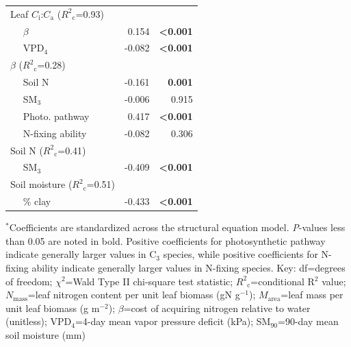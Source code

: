 \begin{table}
\begin{tabular}{p{0.5cm}p{3cm}p{1.5cm}p{1.5cm}}
            \multicolumn{2}{l}{Leaf $C_\mathrm{i}$:$C_\mathrm{a}$ ($R^2{}_\mathrm{c}$=0.93)} && \\
            & \multicolumn{1}{l}{$\beta$}                               & \multicolumn{1}{r}{0.154}     & \multicolumn{1}{r}{\textbf{<0.001}} \\
            & \multicolumn{1}{l}{VPD$_4$}                               & \multicolumn{1}{r}{-0.082}    & \multicolumn{1}{r}{\textbf{<0.001}} \\
            \hline

            \multicolumn{2}{l}{$\beta$ ($R^2{}_\mathrm{c}$=0.28)} && \\
            & \multicolumn{1}{l}{Soil N}                                & \multicolumn{1}{r}{-0.161}    & \multicolumn{1}{r}{\textbf{0.001}} \\
            & \multicolumn{1}{l}{SM$_{3}$}                             & \multicolumn{1}{r}{-0.006}    & \multicolumn{1}{r}{0.915} \\
            & \multicolumn{1}{l}{Photo. pathway}                        & \multicolumn{1}{r}{0.417}     & \multicolumn{1}{r}{\textbf{<0.001}} \\
            & \multicolumn{1}{l}{N-fixing ability}                      & \multicolumn{1}{r}{-0.082}    & \multicolumn{1}{r}{0.306} \\
            \hline

            \multicolumn{2}{l}{Soil N ($R^2{}_\mathrm{c}$=0.41)} && \\
            & \multicolumn{1}{l}{SM$_{3}$} & \multicolumn{1}{r}{-0.409} & \multicolumn{1}{r}{\textbf{<0.001}} \\
            \hline

            \multicolumn{2}{l}{Soil moisture ($R^2{}_\mathrm{c}$=0.51)} && \\
            & \multicolumn{1}{l}{\% clay} & \multicolumn{1}{r}{-0.433} & \multicolumn{1}{r}{\textbf{<0.001}} \\
            \hline

        \end{tabular}%
        \label{tab:table4.5}
    \end{table}
\begin{singlespace}
    \noindent $^*$Coefficients are standardized across the structural equation model. \textit{P}-values less than 0.05 are noted in bold. Positive coefficients for photosynthetic pathway indicate generally larger values in C$_3$ species, while positive coefficients for N-fixing ability indicate generally larger values in N-fixing species. Key: df=degrees of freedom; $\chi^2$=Wald Type II chi-square test statistic; $R^2{}_\mathrm{c}$=conditional R$^2$ value; $N_\mathrm{mass}$=leaf nitrogen content per unit leaf biomass (gN g$^{-1}$); $M_\mathrm{area}$=leaf mass per unit leaf biomass (g m$^{-2}$); $\beta$=cost of acquiring nitrogen relative to water (unitless); VPD$_4$=4-day mean vapor pressure deficit (kPa); SM$_{90}$=90-day mean soil moisture (mm)
\end{singlespace}
\clearpage

